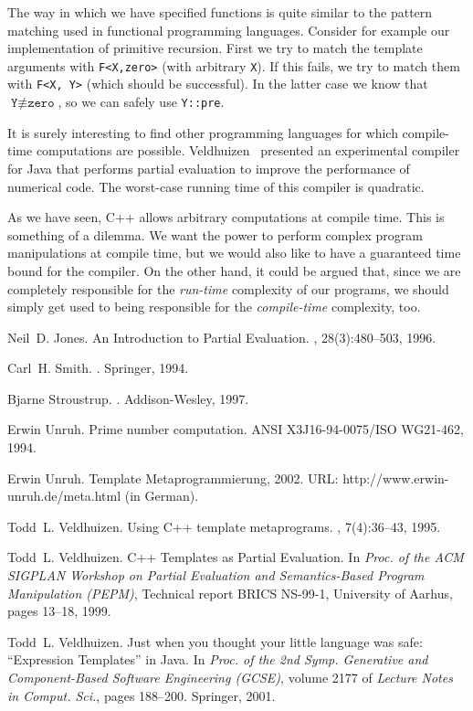 \documentclass[final]{beatcs}
\newcommand{\cppid}[1]{\texttt{#1}}
\begin{document}
The way in which we have specified functions 
is quite similar to the pattern matching used in functional 
programming languages. 
Consider for example our implementation of primitive recursion. First we try
to match the template arguments with \cppid{F<X,zero>} (with arbitrary 
\cppid X). 
If this fails, we try 
to match them with \cppid{F<X, Y>} (which should be successful).
In the latter case we know that $\cppid Y \not\equiv \cppid{zero}$, so we can
safely use \cppid{Y::pre}.

It is surely interesting to find other programming languages for which
com\-pile-time computations are possible.
Veldhuizen~\cite{Veldhuizen:Safe:2001} presented an experimental compiler for
Java that performs partial evaluation to improve the performance of numerical
code. The worst-case running time of this compiler is quadratic.

As we have seen, C++ allows arbitrary computations at compile time. This is
something of a dilemma. We want the power to perform complex program
manipulations at compile time, but we would also like to have a guaranteed
time bound for the compiler. On the other hand, it could be argued that, since
we are completely responsible for the \emph{run-time} complexity of our
programs, we should simply get used to being responsible for the
\emph{compile-time} complexity, too.

\begin{thebibliography}{1}

Neil~D. Jones.
\newblock An Introduction to Partial Evaluation.
, 28(3):480--503, 1996.

Carl~H. Smith.
.
\newblock Springer, 1994.

Bjarne Stroustrup.
.
\newblock Addison-Wesley, 1997.

Erwin Unruh.
\newblock Prime number computation.
\newblock ANSI X3J16-94-0075/ISO WG21-462, 1994.

Erwin Unruh.
\newblock Template Metaprogrammierung, 2002.
\newblock URL: http://www.erwin-unruh.de/meta.html (in German).

Todd~L. Veldhuizen.
\newblock Using {C++} template metaprograms.
, 7(4):36--43, 1995.

Todd~L. Veldhuizen.
\newblock C++ Templates as Partial Evaluation.
\newblock In 
{\em Proc. of the ACM SIGPLAN Workshop on Partial Evaluation and
	Semantics-Based Program Manipulation (PEPM)}, Technical report BRICS NS-99-1,
University of Aarhus, pages 13--18, 1999.

Todd~L. Veldhuizen.
\newblock Just when you thought your little language was safe: ``Expression
Templates'' in {J}ava.
\newblock In 
{\em Proc. of the 2nd Symp. Generative and Component-Based
	Software Engineering (GCSE)}, volume 2177 of {\em Lecture Notes in Comput.
	Sci.}, pages 188--200. Springer, 2001.

\end{thebibliography}
\end{document}
